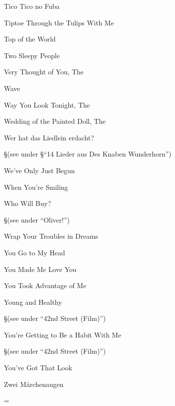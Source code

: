 \N Tico Tico no Fuba


\N Tiptoe Through the Tulips With Me


\N Top of the World


\N Two Sleepy People


\N Very Thought of You, The


\N Wave


\N Way You Look Tonight, The


\N Wedding of the Painted Doll, The


\N Wer hat das Liedlein erdacht?

\nobreak
\S (see under
\S ``14 Lieder aus Des Knaben Wunderhorn'')

\N We've Only Just Begun


\N When You're Smiling


\N Who Will Buy?

\nobreak
\S (see under ``Oliver!'')

\N Wrap Your Troubles in Dreams


\N You Go to My Head


\N You Made Me Love You


\N You Took Advantage of Me


\N Young and Healthy

\nobreak
\S (see under ``42nd Street (Film)'')

\N You're Getting to Be a Habit With Me

\nobreak
\S (see under ``42nd Street (Film)'')

\N You've Got That Look


\N Zwei M{\"a}rchenaugen


\singlecolumn
\vfil\eject
\pagecnt=\pageno
\endinput

